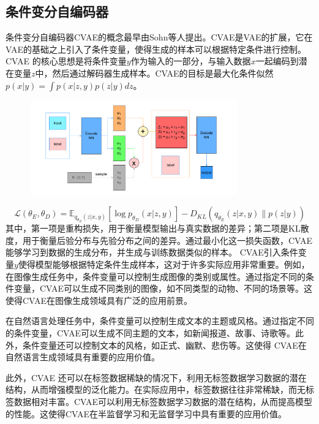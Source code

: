 \subsection{条件变分自编码器}
条件变分自编码器CVAE的概念最早由Sohn等人提出\cite{SohnLee2015ConditionalVAE}。CVAE是VAE的扩展，它在VAE的基础之上引入了条件变量，使得生成的样本可以根据特定条件进行控制。CVAE 的核心思想是将条件变量$y$作为输入的一部分，与输入数据$x$一起编码到潜在变量$z$中，然后通过解码器生成样本。CVAE的目标是最大化条件似然$p(x|y) = \int p(x|z,y) p(z|y) dz$。
\begin{figure}[htbp]
  \centering
  \includegraphics[width=0.8\textwidth]{Fig/CVAE示意图.drawio.pdf}
\end{figure}
\begin{equation}
  \mathcal{L}(\theta_E, \theta_D) = \mathbb{E}_{q_{\theta_E}(z|x,y)} \left[ \log p_{\theta_D}(x|z,y) \right] - D_{KL}(q_{\theta_E}(z|x,y) \| p(z|y))
  \label{eq:cvae}
\end{equation}
其中，第一项是重构损失，用于衡量模型输出与真实数据的差异；第二项是KL散度，用于衡量后验分布与先验分布之间的差异。通过最小化这一损失函数，CVAE能够学习到数据的生成分布，并生成与训练数据类似的样本。
CVAE引入条件变量$y$使得模型能够根据特定条件生成样本，这对于许多实际应用非常重要。例如，在图像生成任务中，条件变量可以控制生成图像的类别或属性。通过指定不同的条件变量，CVAE可以生成不同类别的图像，如不同类型的动物、不同的场景等。这使得CVAE在图像生成领域具有广泛的应用前景。

在自然语言处理任务中，条件变量可以控制生成文本的主题或风格。通过指定不同的条件变量，CVAE可以生成不同主题的文本，如新闻报道、故事、诗歌等。此外，条件变量还可以控制文本的风格，如正式、幽默、悲伤等。这使得 CVAE在自然语言生成领域具有重要的应用价值。

此外，CVAE 还可以在标签数据稀缺的情况下，利用无标签数据学习数据的潜在结构，从而增强模型的泛化能力。在实际应用中，标签数据往往非常稀缺，而无标签数据相对丰富。CVAE可以利用无标签数据学习数据的潜在结构，从而提高模型的性能。这使得CVAE在半监督学习和无监督学习中具有重要的应用价值。

